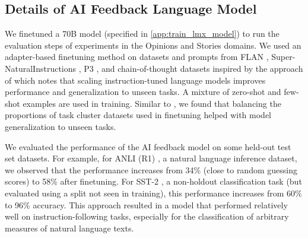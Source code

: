 \subsection{Details of AI Feedback Language Model}\label{app:train_ai_feedback_model}
We finetuned a 70B model (specified in \cref{app:train_lmx_model}) to run the evaluation steps of experiments in the Opinions and Stories domains. We used an adapter-based finetuning method \citep{he2021towards} on datasets and prompts from FLAN \citep{wei2021finetuned},  
Super-NaturalInstructions \citep{wang2022super}, P3 \citep{sanh2021multitask}, and chain-of-thought datasets inspired by the approach of \citet{chung2022scaling} which notes that scaling instruction-tuned language models improves performance and generalization to unseen tasks. A mixture of zero-shot and few-shot examples are used in training. Similar to \citet{chung2022scaling}, we found that balancing the proportions of task cluster datasets used in finetuning helped with model generalization to unseen tasks.

We evaluated the performance of the AI feedback model on some held-out test set datasets. For example, for ANLI (R1) \citep{nie2019adversarial}, a natural language inference dataset, we observed that the performance increases from 34\% (close to random guessing scores) to 58\% after finetuning. For SST-2 \citep{socher2013recursive}, a non-holdout classification task (but evaluated using a split not seen in training), this performance increases from 60\% to 96\% accuracy. This approach resulted in a model that performed relatively well on instruction-following tasks, especially for the classification of arbitrary measures of natural language texts.

